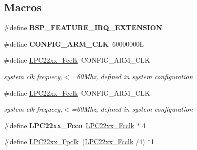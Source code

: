 \subsection*{Macros}
\begin{DoxyCompactItemize}
\item 
\mbox{\label{group__RTEMSBSPsARMRTL22XX_ga5d7d631d3a14b7554160f14eb42f351b}} 
\#define {\bfseries B\+S\+P\+\_\+\+F\+E\+A\+T\+U\+R\+E\+\_\+\+I\+R\+Q\+\_\+\+E\+X\+T\+E\+N\+S\+I\+ON}
\item 
\mbox{\label{group__RTEMSBSPsARMRTL22XX_ga9941feb1bf15cab4e24f8b6ae052a8b7}} 
\#define {\bfseries C\+O\+N\+F\+I\+G\+\_\+\+A\+R\+M\+\_\+\+C\+LK}~60000000L
\item 
\mbox{\label{group__RTEMSBSPsARMRTL22XX_ga6908debccd684bd73ca9733f80c2b046}} 
\#define \mbox{\hyperlink{group__RTEMSBSPsARMRTL22XX_ga6908debccd684bd73ca9733f80c2b046}{L\+P\+C22xx\+\_\+\+Fcclk}}~C\+O\+N\+F\+I\+G\+\_\+\+A\+R\+M\+\_\+\+C\+LK
\begin{DoxyCompactList}\small\item\em system clk frequecy,$<$=60Mhz, defined in system configuration \end{DoxyCompactList}\item 
\mbox{\label{group__RTEMSBSPsARMRTL22XX_ga6908debccd684bd73ca9733f80c2b046}} 
\#define \mbox{\hyperlink{group__RTEMSBSPsARMRTL22XX_ga6908debccd684bd73ca9733f80c2b046}{L\+P\+C22xx\+\_\+\+Fcclk}}~C\+O\+N\+F\+I\+G\+\_\+\+A\+R\+M\+\_\+\+C\+LK
\begin{DoxyCompactList}\small\item\em system clk frequecy,$<$=60Mhz, defined in system configuration \end{DoxyCompactList}\item 
\mbox{\label{group__RTEMSBSPsARMRTL22XX_ga348626f5080246419cdc87dafc97530f}} 
\#define {\bfseries L\+P\+C22xx\+\_\+\+Fcco}~\mbox{\hyperlink{group__RTEMSBSPsARMRTL22XX_ga6908debccd684bd73ca9733f80c2b046}{L\+P\+C22xx\+\_\+\+Fcclk}} $\ast$ 4
\item 
\mbox{\label{group__RTEMSBSPsARMRTL22XX_gaa08c515d8f26ba385e6a73219755e265}} 
\#define \mbox{\hyperlink{group__RTEMSBSPsARMRTL22XX_gaa08c515d8f26ba385e6a73219755e265}{L\+P\+C22xx\+\_\+\+Fpclk}}~(\mbox{\hyperlink{group__RTEMSBSPsARMRTL22XX_ga6908debccd684bd73ca9733f80c2b046}{L\+P\+C22xx\+\_\+\+Fcclk}} /4) $\ast$1

\end{DoxyCompactItemize}
